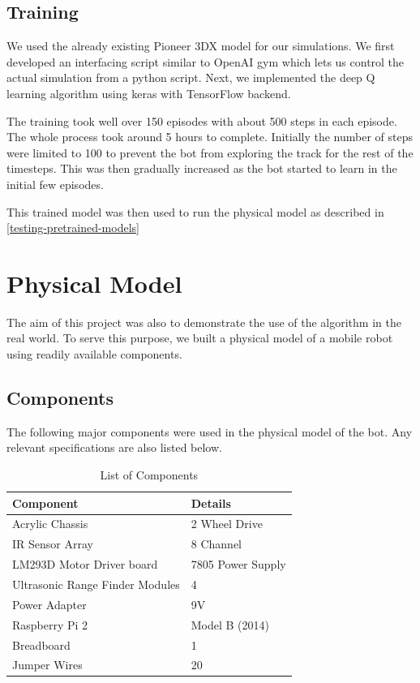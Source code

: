 \documentclass[12pt]{extreport}
\theoremstyle{plain}
\theoremstyle{definition}
\begin{document}
\section{Training}

We used the already existing Pioneer 3DX model for our simulations. We first developed an interfacing script similar to OpenAI gym which lets us control the actual simulation from a python script. Next, we implemented the deep Q learning algorithm using keras with TensorFlow backend.

The training took well over 150 episodes with about 500 steps in each episode. The whole process took around 5 hours to complete. Initially the number of steps were limited to 100 to prevent the bot from exploring the track for the rest of the timesteps. This was then gradually increased as the bot started to learn in the initial few episodes.

This trained model was then used to run the physical model as described in \autoref{testing-pretrained-models}


\chapter{Physical Model}
The aim of this project was also to demonstrate the use of the algorithm in the real world. To serve this purpose, we built a physical model of a mobile robot using readily available components.

\section{Components}
The following major components were used in the physical model of the bot. Any relevant specifications are also listed below.

\begin{table}[h]
\centering
\begin{tabular}{@{}ll@{}}
\toprule
Component                       & Details           \\ \midrule
Acrylic Chassis                 & 2 Wheel Drive     \\
IR Sensor Array                 & 8 Channel         \\
LM293D Motor Driver board       & 7805 Power Supply \\
Ultrasonic Range Finder Modules & 4                 \\
Power Adapter                   & 9V                \\
Raspberry Pi 2                  & Model B (2014)    \\
Breadboard                      & 1                 \\
Jumper Wires                    & 20                \\ \bottomrule
\end{tabular}%
\caption{List of Components}
\end{table}
\end{document}
